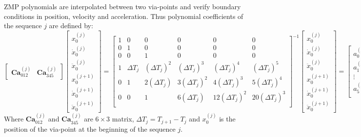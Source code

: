 \documentclass[journal]{IEEEtran}
\begin{document}
ZMP polynomials are interpolated between two via-points and verify boundary conditions in position, velocity and acceleration. Thus polynomial coefficients of the sequence $j$ are defined by:
\begin{equation}
\label{eq:interpol_poly}
\begin{bmatrix}
{\textbf{Ca}}^{(j)}_{012} & {\textbf{Ca}}^{(j)}_{345}
\end{bmatrix}
\begin{bmatrix}
x_0^{(j)} \\
\dot{x}_0^{(j)} \\
\ddot{x}_0^{(j)}\\
x_0^{(j+1)} \\
\dot{x}_0^{(j+1)} \\
\ddot{x}_0^{(j+1)}
\end{bmatrix}
=
\begin{bmatrix}
1 & 0 & 0 & 0 & 0 & 0 \\
0 & 1 & 0 & 0 & 0 & 0 \\
0 & 0 & 1 & 0 & 0 & 0 \\
1 & \Delta T_{j} & (\Delta T_{j})^{2} & (\Delta T_{j})^{3} & (\Delta T_{j})^{4} & (\Delta T_{j})^{5} \\
0 & 1 & 2(\Delta T_{j}) & 3(\Delta T_{j})^{2} & 4(\Delta T_{j})^{3} & 5(\Delta T_{j})^{4} \\
0 & 0 & 1 & 6(\Delta T_{j}) & 12(\Delta T_{j})^{2} & 20(\Delta T_{j})^{3} \\
\end{bmatrix}^{-1}
\begin{bmatrix}
x_0^{(j)} \\
\dot{x}_0^{(j)} \\
\ddot{x}_0^{(j)}\\
x_0^{(j+1)} \\
\dot{x}_0^{(j+1)} \\
\ddot{x}_0^{(j+1)}
\end{bmatrix}
=
\begin{bmatrix}
a_0^{(j)} \\
a_1^{(j)} \\
\vdots \\
a_5^{(j)} \\
\end{bmatrix}
\end{equation}
Where $\textbf{Ca}^{(j)}_{012}$ and $\textbf{Ca}^{(j)}_{345}$ are $6\times 3$ matrix, $\Delta T_{j}=T_{j+1}-T_j$ and $x_0^{(j)}$ is the position of the via-point at the beginning of the sequence $j$.
\end{document}
